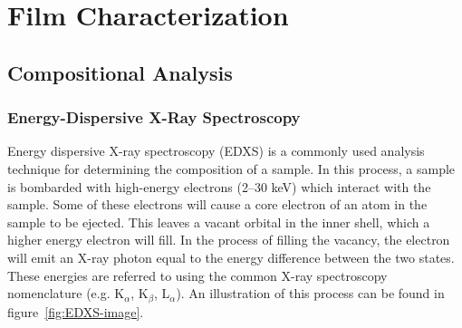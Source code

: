 \chapter{Film Characterization}
\label{chap:Charact}
\thispagestyle{empty}

%
%
%
%
%
%
%
%
%
%
%

\section{Compositional Analysis}
\label{sec:Charact-Comp}

\subsection{Energy-Dispersive X-Ray Spectroscopy}

Energy dispersive X-ray spectroscopy (EDXS) is a commonly used analysis technique for determining the composition of a sample. In this process, a sample is bombarded with high-energy electrons (2--30 keV) which interact with the sample. Some of these electrons will cause a core electron of an atom in the sample to be ejected. This leaves a vacant orbital in the inner shell, which a higher energy electron will fill. In the process of filling the vacancy, the electron will emit an X-ray photon equal to the energy difference between the two states. These energies are referred to using the common X-ray spectroscopy nomenclature (e.g. K$_{\alpha}$, K$_{\beta}$, L$_{\alpha}$). An illustration of this process can be found in figure~\vref{fig:EDXS-image}.  

